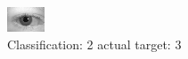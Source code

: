 \begin{figure}[h!]
\begin{center}
\includegraphics[width=0.60\columnwidth]{figures/ID554_class_2_target_3.png}
\end{center}
\caption{ Classification: 2 actual target: 3}
\label{fig:ID554_class_2_target_3}
\end{figure}
